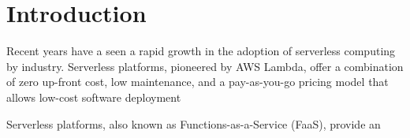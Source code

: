 \section{Introduction}

Recent years have a seen a rapid growth in the adoption of serverless computing
by industry. Serverless platforms, pioneered by AWS Lambda, offer a combination
of zero up-front cost, low maintenance, and a pay-as-you-go pricing model that
allows low-cost software deployment %

Serverless platforms, also known as Functions-as-a-Service (FaaS), provide an  

%
%
%
%

%
%
%
%
